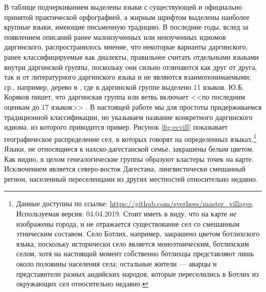 \par В таблице подчеркиванием выделены языки с существующей и официально принятой практической орфографией, а жирным шрифтом выделены наиболее крупные языки, имеющие письменную традицию. В последние годы, вслед за появлением описаний ранее малоизученных или неизученных идиомов даргинского, распространилось мнение, что некоторые варианты даргинского, ранее классифицируемые как диалекты, правильнее считать отдельными языками внутри даргинской группы, поскольку они сильно отличаются как друг от друга, так и от литературного даргинского языка и не являются взаимопонимаемыми; ср., например, дерево в \citep[21]{koryakov2006}, где в даргинской группе выделено 11 языков. Ю.Б. Коряков пишет, что даргинская группа или ветвь включает <<по последним оценкам до 17 языков>> \citep[11]{koryakov2006}. В настоящей работе мы для простоты придерживаемся традиционной классификации, но указываем название конкретного даргинского идиома, из которого приводится пример. Рисунок \ref{fig:ecvill} показывает географическое распределение сел, в которых говорят на определенных языках.\footnote{Данные доступны по ссылке: \url{https://github.com/sverhees/master_villages}. Используемая версия: 04.04.2019. \color{purple} Стоит иметь в виду, что на карте \textit{не} изображены города, и не отражается существование сел со смешанным этническим составом. Село Ботлих, например, закрашено цветом ботлихского языка, поскольку исторически село является моноэтническим, ботлихским селом, хотя на настоящий момент собственно ботлихцы представляют лишь около половины населения села; остальные жители --- аварцы и представители разных андийских народов, которые переселились в Ботлих из окружающих сел относительно недавно.} Языки, не относящиеся к нахско-дагестанской семье, закрашены белым цветом. Как видно, в целом генеалогические группы образуют кластеры точек на карте. Исключением является северо-восток Дагестана, лингвистически смешанный регион, населенный переселенцами из других местностей относительно недавно.

\label{map}

